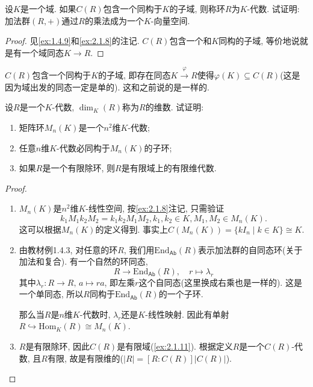 \begin{problem}\label{ex:2.1.12}
    设$K$是一个域. 如果$C(R)$包含一个同构于$K$的子域, 则称环$R$为$K$-代数. 试证明: 加法群$(R, +)$通过$R$的乘法成为一个$K$-向量空间.
\end{problem}

\begin{proof}
    见\ref{ex:1.4.9}和\ref{ex:2.1.8}的注记. $C(R)$包含一个和$K$同构的子域, 等价地说就是有一个域同态$K \to R$.
\end{proof}

\begin{remark}
    $C(R)$包含一个同构于$K$的子域, 即存在同态$K \overset{\varphi}\to R$使得$\varphi(K) \subseteq C(R)$(这是因为域出发的同态一定是单的). 这和之前说的是一样的.
\end{remark}

\begin{problem}\label{ex:2.1.13}
    设$R$是一个$K$-代数, $\dim_K(R)$称为$R$的维数. 试证明: 
    \begin{enumerate}[(1)]
        \item 矩阵环$M_n(K)$是一个$n^2$维$K$-代数;
        \item 任意$n$维$K$-代数必同构于$M_n(K)$的子环;
        \item 如果$R$是一个有限除环, 则$R$是有限域上的有限维代数.
    \end{enumerate}
\end{problem}

\begin{proof}
    \begin{enumerate}[(1)]
        \item $M_n(K)$是$n^2$维$K$-线性空间, 按\ref{ex:2.1.8}注记, 只需验证
        \[
            k_1M_1k_2M_2 = k_1k_2M_1M_2, k_1, k_2 \in K, M_1, M_2 \in M_n(K).
        \]
        这可以根据$M_n(K)$的定义得到. 事实上$C(M_n(K)) = \{kI_n \mid k \in K\} \cong K$.
        \item 由教材例1.4.3, 对任意的环$R$, 我们用$\mathrm{End}_{\mathsf{Ab}}(R)$表示加法群的自同态环(关于加法和复合). 有一个自然的环同态,
        \[
            R \to \mathrm{End}_{\mathsf{Ab}}(R),\quad r \mapsto \lambda_r
        \]
        其中$\lambda_r: R \to R,\, a \mapsto ra$, 即左乘$r$这个自同态(这里换成右乘也是一样的). 这是一个单同态, 所以$R$同构于$\mathrm{End}_{\mathsf{Ab}}(R)$的一个子环.

        那么当$R$是$n$维$K$-代数时, $\lambda_r$还是$K$-线性映射. 因此有单射$R \hookrightarrow \mathrm{Hom}_K(R) \cong M_n(K)$.
        \item $R$是有限除环, 因此$C(R)$是有限域(\ref{ex:2.1.11}). 根据定义$R$是一个$C(R)$-代数, 且$R$有限, 故是有限维的($|R| = [R:C(R)]|C(R)|$).
    \end{enumerate}
\end{proof}

